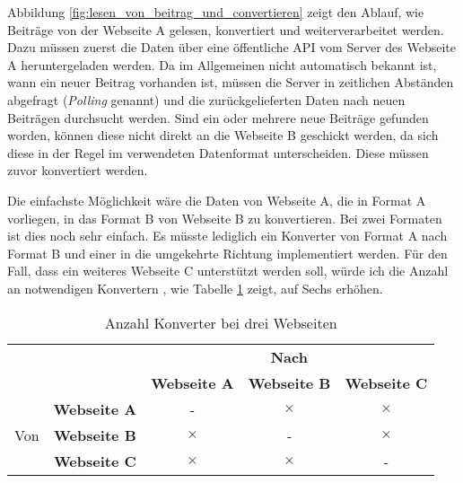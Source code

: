 Abbildung \ref{fig:lesen_von_beitrag_und_convertieren} zeigt den Ablauf, wie Beiträge von der Webseite A gelesen, konvertiert und weiterverarbeitet werden. Dazu müssen zuerst die Daten über eine öffentliche API vom Server des Webseite A heruntergeladen werden. Da im Allgemeinen nicht automatisch bekannt ist, wann ein neuer Beitrag vorhanden ist, müssen die Server in zeitlichen Abständen abgefragt (\emph{Polling} genannt) und die zurückgelieferten Daten nach neuen Beiträgen durchsucht werden. Sind ein oder mehrere neue Beiträge gefunden worden, können diese nicht direkt an die Webseite B geschickt werden, da sich diese in der Regel im verwendeten Datenformat unterscheiden. Diese müssen zuvor konvertiert werden.

Die einfachste Möglichkeit wäre die Daten von Webseite A, die in Format A vorliegen, in das Format B von Webseite B zu konvertieren. Bei zwei Formaten ist dies noch sehr einfach. Es müsste lediglich ein Konverter von Format A nach Format B und einer in die umgekehrte Richtung implementiert werden. Für den Fall, dass ein weiteres Webseite C unterstützt werden soll, würde ich die Anzahl an notwendigen Konvertern , wie Tabelle \ref{tbl:anzahl_konvertern_bei_drei_netzwerken} zeigt, auf Sechs erhöhen. 

\begin{table}[ht]
    \centering
    \caption{Anzahl Konverter bei drei Webseiten}
    
    \begin{tabular}{c|c|c|c|c}
        \multicolumn{2}{c|}{\multirow{2}{*}{}} & 
        \multicolumn{3}{|c}{\textbf{Nach}}   \\ 
        \cline{3-5} 

        \multicolumn{2}{c|}{} & 
        \textbf{Webseite A} & 
        \textbf{Webseite B} & 
        \textbf{Webseite C} \\ 
        \hline

        \multirow{3}{*}{Von} & 
        \textbf{Webseite A} & 
        -&            
        $ \times $ &            
        $ \times $ \\ 
        \cline{2-5} 

        & 
        \textbf{Webseite B} &            
        $ \times $ &            
        -&            
        $ \times $ \\ 
        \cline{2-5} 
         
        & 
        \textbf{Webseite C} &            
        $ \times $ &            
        $ \times $ &            
        -\\
    \end{tabular}
    \label{tbl:anzahl_konvertern_bei_drei_netzwerken}
\end{table}

